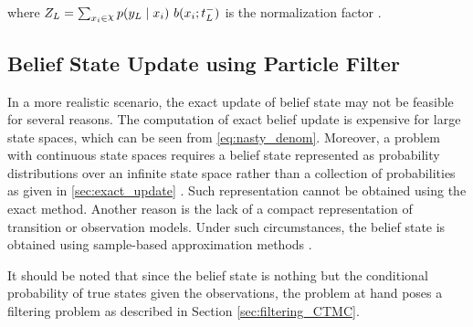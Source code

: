 where $ Z_{L} = \sum_{x_{i}\in \rchi} p(y_{L} \mid x_{i})\ b(x_{i}; t_{L}^{-}) $ is the normalization factor \cite{article}.

\subsection{Belief State Update using Particle Filter}
\label{sec:particle_filter}
In a more realistic scenario, the exact update of belief state may not be feasible for several reasons. The computation of exact belief update is expensive for large state spaces, which can be seen from \autoref{eq:nasty_denom}. Moreover, a problem with continuous state spaces requires a belief state represented as probability distributions over an infinite state space rather than a collection of probabilities as given in \cref{sec:exact_update} \cite{Carlo1904}. Such representation cannot be obtained using the exact method. Another reason is the lack of a compact representation of transition or observation models. Under such circumstances, the belief state is obtained using sample-based approximation methods \cite{Carlo1904}. \par
It should be noted that since the belief state is nothing but the conditional probability of true states given the observations, the problem at hand poses a filtering problem as described in Section \ref{sec:filtering_CTMC}.

